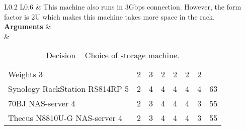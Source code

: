 \begin{table}[H]
\begin{tabular}{L{0.2\textwidth} L{0.6\textwidth}}
		& This machine also runs in 3Gbps connection. However, the form factor is 2U which makes this machine takes more space in the rack.\\
		\midrule
		\textbf{Arguments}      & \\
		&   \begin{tabular}{l|llllll|l}
		                                  & \rot{Reliability} & \rot{Performance} & \rot{Interoperability} & \rot{Security} & \rot{Scalability} & \rot{Cost} & \rot{\textbf{Score}} \\ \hline
		Weights                         3 & 2 & 3 & 2 & 2 & 2 & 2 \\ \hline
		Synology RackStation RS814RP    5 & 2                 & 4                 & 4                      & 4              & 4                 & 4          & 63                   \\ 
		70BJ NAS-server                 4 & 2                 & 3                 & 4                      & 4              & 4                 & 3          & 55                   \\
		Thecus N8810U-G NAS-server      4 & 2                 & 3                 & 4                      & 4              & 4                 & 3          & 55                   \\
	\end{tabular} \\
	\\ \bottomrule
	\end{tabular}
	\caption{Decision -- Choice of storage machine.}
	\label{table:database-selection}
\end{table}

